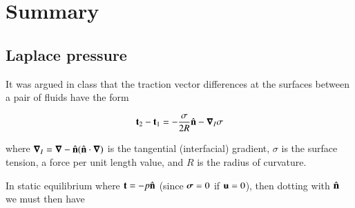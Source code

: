 \section{Summary}
%
%
%
%
%
%

\subsection{Laplace pressure}

It was argued in class that the traction vector differences at the surfaces between a pair of fluids have the form

\begin{equation}\label{eqn:continuumFluidsReview:2090}
\mathbf{t}_2 - \mathbf{t}_1 = -\frac{\sigma}{2 R} \hat{\mathbf{n}} - \boldsymbol{\nabla}_I \sigma
\end{equation}

where $\boldsymbol{\nabla}_I = \boldsymbol{\nabla} - \hat{\mathbf{n}} (\hat{\mathbf{n}} \cdot \boldsymbol{\nabla})$ is the tangential (interfacial) gradient, $\sigma$ is the surface tension, a force per unit length value, and $R$ is the radius of curvature.

In static equilibrium where $\mathbf{t} = -p \hat{\mathbf{n}}$ (since $\boldsymbol{\sigma} = 0$ if $\mathbf{u} = 0$), then dotting with $\hat{\mathbf{n}}$ we must then have

